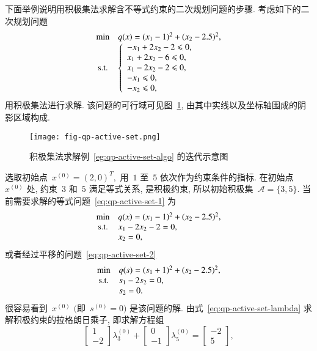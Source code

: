 \begin{exam}\label{eg:qp-active-set-algo}
下面举例说明用积极集法求解含不等式约束的二次规划问题的步骤. 考虑如下的二次规划问题
\begin{equation*}
\begin{array}{cl}
\min & q({x}) = (x_1 - 1)^2 + (x_2 - 2.5)^2, \\
{\rm s.t.} & \left\{\begin{array}{l}-x_1 + 2x_2 - 2 \leqslant 0, \\
 x_1 + 2x_2 - 6 \leqslant 0, \\
 x_1 - 2x_2 - 2 \leqslant 0, \\
 -x_1 \leqslant 0, \\
 -x_2 \leqslant 0,\end{array}\right.
\end{array}
\end{equation*}
用积极集法进行求解. 该问题的可行域可见图~\ref{fig:active-set-eg}, 由其中实线以及坐标轴围成的阴影区域构成.
\begin{figure}[htpb]
\centering
\texttt{[image: fig-qp-active-set.png]}
\caption{积极集法求解例~\ref{eg:qp-active-set-algo}
的迭代示意图}\label{fig:active-set-eg}
\end{figure}
选取初始点~${x}^{(0)} = (2, 0)^T,$ 用~$1$ 至~$5$ 依次作为约束条件的指标. 在初始点~${x}^{(0)}$ 处, 约束~$3$ 和~$5$ 满足等式关系, 是积极约束, 所以初始积极集~$\mathcal{A} = \{ 3, 5 \}.$ 当前需要求解的等式问题~\eqref{eq:qp-active-set-1} 为
\begin{equation*}
\begin{array}{cl}
\min & q({x}) = (x_1 - 1)^2 + (x_2 - 2.5)^2, \\
{\rm s.t.} & x_1 - 2x_2 - 2 = 0, \\
& x_2 = 0,
\end{array}
\end{equation*}
或者经过平移的问题~\eqref{eq:qp-active-set-2}
\begin{equation*}
\begin{array}{cl}
\min & q({s}) = (s_1 + 1)^2 + (s_2 - 2.5)^2, \\
{\rm s.t.} & s_1 - 2s_2 = 0, \\
& s_2 = 0.
\end{array}
\end{equation*}
很容易看到~${x}^{(0)}$ $($即~${s}^{(0)} = {0}$$)$ 是该问题的解.
由式~\eqref{eq:qp-active-set-lambda} 求解积极约束的拉格朗日乘子, 即求解方程组
\begin{equation*}
\begin{bmatrix} 1 \\ -2 \end{bmatrix} \lambda_3^{(0)} + \begin{bmatrix} 0 \\ -1 \end{bmatrix} \lambda_5^{(0)} = \begin{bmatrix} -2 \\ 5 \end{bmatrix},

\end{equation*}$$
\end{exam}
